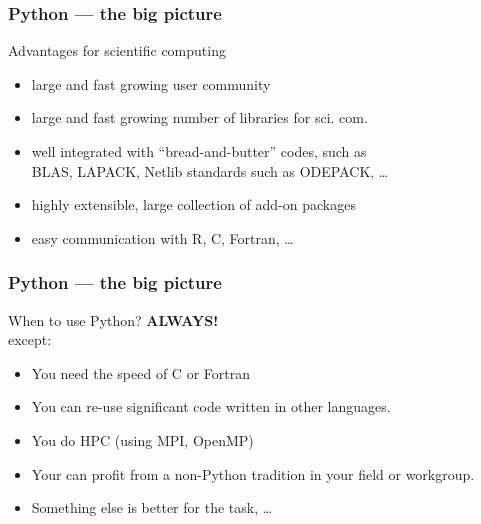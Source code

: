 \documentclass[xcolor=pdftex,dvipsnames,table]{beamer}
\begin{document}
\begin{frame}
  \frametitle{Python --- the big picture}
  \begin{block}{Advantages for scientific computing}
  \begin{itemize}[<+->]
  \item large and fast growing user community
  \item large and fast growing number of libraries for sci. com.
  \item well integrated with ``bread-and-butter'' codes, such as\\
    BLAS, LAPACK, Netlib standards such as ODEPACK, \ldots
  \item highly extensible, large collection of add-on packages
  \item easy communication with R, C, Fortran, \ldots
  \end{itemize}
  \end{block}
\end{frame}

\begin{frame}
  \frametitle{Python --- the big picture}
  \begin{block}{When to use Python?}
    \textbf{ALWAYS!}\\
    except:
    \begin{itemize}[<+->]
    \item You need the speed of C or Fortran
    \item You can re-use significant code written in other languages.
    \item You do HPC (using MPI, OpenMP)
    \item Your can profit from a non-Python tradition in your field or workgroup.
    \item Something else is better for the task, \ldots
    \end{itemize}
  \end{block}
\end{frame}
\end{document}
